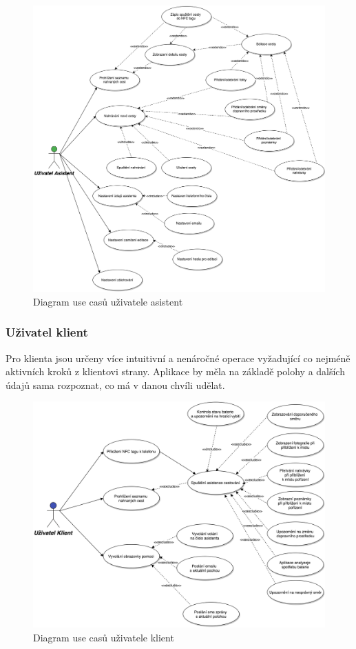 \documentclass{article}
\numberwithin{equation}{section}
\begin{document}
\begin{figure}[H]
        \centering
                \includegraphics[scale=0.2]{img/UseCasesAsistant.png}
        \caption{Diagram use casů uživatele asistent}
        \label{fig:UseCasesAsistant}
\end{figure}

\subsubsection{Uživatel klient}
Pro klienta jsou určeny více intuitivní a nenáročné operace vyžadující co nejméně aktivních
kroků z klientovi strany. Aplikace by měla na základě polohy a dalších údajů sama rozpoznat,
co má v  danou chvíli udělat.

\begin{figure}[H]
        \centering
                \includegraphics[scale=0.2]{img/UseCasesClient.png}
        \caption{Diagram use casů uživatele klient}
        \label{fig:UseCasesClient}
\end{figure}
\end{document}
